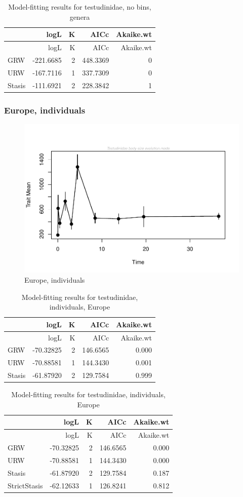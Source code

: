 \documentclass[]{article}
\begin{document}
\begin{longtable}[]{@{}lrrrr@{}}
\caption{Model-fitting results for testudinidae, no bins,
genera}\tabularnewline
\toprule
& logL & K & AICc & Akaike.wt\tabularnewline
\midrule
\endfirsthead
\toprule
& logL & K & AICc & Akaike.wt\tabularnewline
\midrule
\endhead
GRW & -221.6685 & 2 & 448.3369 & 0\tabularnewline
URW & -167.7116 & 1 & 337.7309 & 0\tabularnewline
Stasis & -111.6921 & 2 & 228.3842 & 1\tabularnewline
\bottomrule
\end{longtable}

\newpage

\subsubsection{Europe, individuals}\label{europe-individuals}

\begin{figure}[htbp]
\centering
\includegraphics{MA_JJ_files/figure-latex/paleoTS, individuals, Europe-1.pdf}
\caption{Europe, individuals}
\end{figure}

\begin{longtable}[]{@{}lrrrr@{}}
\caption{Model-fitting results for testudinidae, individuals,
Europe}\tabularnewline
\toprule
& logL & K & AICc & Akaike.wt\tabularnewline
\midrule
\endfirsthead
\toprule
& logL & K & AICc & Akaike.wt\tabularnewline
\midrule
\endhead
GRW & -70.32825 & 2 & 146.6565 & 0.000\tabularnewline
URW & -70.88581 & 1 & 144.3430 & 0.001\tabularnewline
Stasis & -61.87920 & 2 & 129.7584 & 0.999\tabularnewline
\bottomrule
\end{longtable}

\begin{longtable}[]{@{}lrrrr@{}}
\caption{Model-fitting results for testudinidae, individuals,
Europe}\tabularnewline
\toprule
& logL & K & AICc & Akaike.wt\tabularnewline
\midrule
\endfirsthead
\toprule
& logL & K & AICc & Akaike.wt\tabularnewline
\midrule
\endhead
GRW & -70.32825 & 2 & 146.6565 & 0.000\tabularnewline
URW & -70.88581 & 1 & 144.3430 & 0.000\tabularnewline
Stasis & -61.87920 & 2 & 129.7584 & 0.187\tabularnewline
StrictStasis & -62.12633 & 1 & 126.8241 & 0.812\tabularnewline
\bottomrule
\end{longtable}
\end{document}
